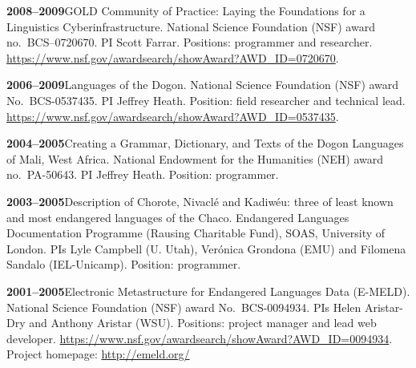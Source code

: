 \documentclass[11pt]{article}
\newcommand{\hangpara}{
 \setlength{\parindent}{0in} %
 \hangindent=0.42in %
}
\begin{document}
\vskip 6pt
\hangpara
{\bf 2008--2009}\hspace{1ex}GOLD Community of Practice: Laying the Foundations for a Linguistics Cyberinfrastructure. National Science Foundation (NSF) award no.\ BCS--0720670. PI Scott Farrar. Positions: programmer and researcher. \url{https://www.nsf.gov/awardsearch/showAward?AWD_ID=0720670}. %

\vskip 6pt
\hangpara
{\bf 2006--2009}\hspace{1ex}Languages of the Dogon. National Science Foundation (NSF) award No.\ BCS-0537435. PI Jeffrey Heath. Position: field researcher and technical lead. \url{https://www.nsf.gov/awardsearch/showAward?AWD_ID=0537435}.

\vskip 6pt
\hangpara
{\bf 2004--2005}\hspace{1ex}Creating a Grammar, Dictionary, and Texts of the Dogon Languages of Mali, West Africa. National Endowment for the Humanities (NEH) award no.\ PA-50643. PI Jeffrey Heath. Position: programmer.

\vskip 6pt
\hangpara
{\bf 2003--2005}\hspace{1ex}Description of Chorote, Nivacl{\'e} and Kadiw{\'e}u: three of least known and most endangered languages of the Chaco. Endangered Languages Documentation Programme (Rausing Charitable Fund), SOAS, University of London. PIs Lyle Campbell (U. Utah), Ver{\'o}nica Grondona (EMU) and Filomena Sandalo (IEL-Unicamp). Position: programmer.

\vskip 6pt
\hangpara
{\bf 2001--2005}\hspace{1ex}Electronic Metastructure for Endangered Languages Data (E-MELD). National Science Foundation (NSF) award No.\ BCS-0094934. PIs Helen Aristar-Dry and Anthony Aristar (WSU). Positions: project manager and lead web developer. \url{https://www.nsf.gov/awardsearch/showAward?AWD_ID=0094934}. Project homepage: \url{http://emeld.org/}
\end{document}
